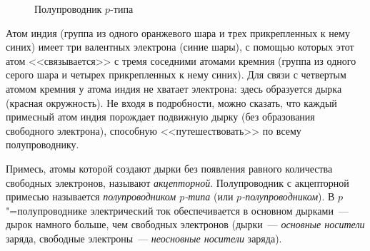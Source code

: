 \documentclass[main.tex]{subfiles}
\begin{document}
\begin{NoHyper}
\begin{figure}[H]
\caption{Полупроводник $p$-типа}
\label{fig:p130}
\end{figure}


Атом индия (группа из одного оранжевого шара и трех прикрепленных к нему синих) имеет три валентных электрона (синие шары), с помощью которых этот атом <<связывается>> с тремя соседними атомами кремния (группа из одного серого шара и четырех прикрепленных к нему синих). Для связи с четвертым атомом кремния у атома индия не хватает электрона: здесь образуется дырка (красная окружность). Не входя в подробности, можно сказать, что каждый примесный атом индия порождает подвижную дырку (без образования свободного электрона),
способную <<путешествовать>> по всему полупроводнику.

Примесь, атомы которой создают дырки без появления равного количества свободных электронов, называют \emph{акцепторной}. Полупроводник с акцепторной примесью называется \emph{полупроводником $p$-типа} (или \emph{$p$-полупроводником}). В $p$"=полупроводнике электрический ток обеспечивается в основном дырками~--- дырок намного больше, чем свободных электронов (дырки~--- \emph{основные носители} заряда, свободные электроны~--- \emph{неосновные носители} заряда). 


\end{NoHyper}
\end{document}
